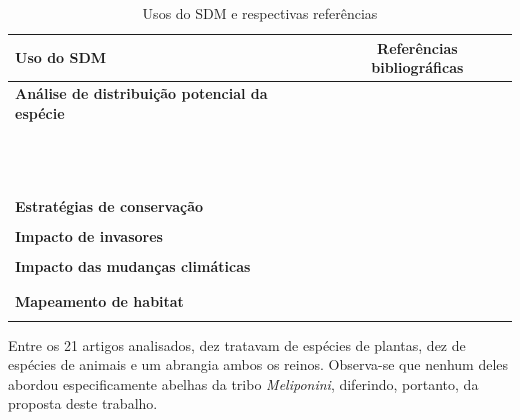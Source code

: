 \begin{table}[h]
 \captionsetup{width=0.83\textwidth}
 \centering
 \caption{Usos do SDM e respectivas referências}\label{tab:usos_sdm}
\begin{tabular}{p{8cm} c}
\toprule
\textbf{Uso do SDM} & \textbf{Referências bibliográficas} \\
\midrule
\textbf{Análise de distribuição potencial da espécie }
&\cite{Carlos:2025}\\
&\cite{Abadijoo2025}\\
&\cite{Zhang_He_Hui_Sha_Cheng_2025}\\
&\cite{radovi:2025}\\
&\cite{Song_Xu_Long_Wang_Chen_Li_Jiang_Deng_2024}\\
&\cite{Vaishnav_Maurya_Durgapal_Rana_2025}\\
&\cite{Sheidai_Noormohammadi_Alishah_2024}\\
&\cite{Singleton:2024}\\
&\cite{gutierrez:2024}\\
&\cite{han_2024}\\
&\cite{Oskolski_2024}\\
&\cite{Edalat_2025}\\
&\cite{zhao:2024}\\
&\cite{wang:2024}\\
\midrule
\textbf{Estratégias de conservação}
  & \cite{Tao_Liu_Dao_Liu_Yang_Sun_2024} \\
  & \cite{Adjacou_Idohou_Yaoitcha_Ayena_Houehanou_Gouwakinnou_2025} \\
\midrule
\textbf{Impacto de invasores}
  & \cite{Ruzzier_Lupi_Tirozzi_Dondina_Orioli_Jucker_Bani_2024} \\
  & \cite{Abadijoo2025} \\
\midrule
\textbf{Impacto das mudanças climáticas}
  & \cite{Ruzzier_Lupi_Tirozzi_Dondina_Orioli_Jucker_Bani_2024} \\
  & \cite{Dogbo_2025} \\
  & \cite{Habibi_Achour_Bounaceur_Benaradj_Aulagnier_2024} \\
\midrule
\textbf{Mapeamento de habitat}
  & \cite{Overly_Lecours_2024} \\
  & \cite{Zenebe_2024} \\
\bottomrule
\end{tabular}
\end{table}

Entre os 21 artigos analisados, dez tratavam de espécies de plantas, dez de espécies de animais e um abrangia ambos os reinos. Observa-se que nenhum deles abordou especificamente abelhas da tribo \textit{Meliponini}, diferindo, portanto, da proposta deste trabalho.


